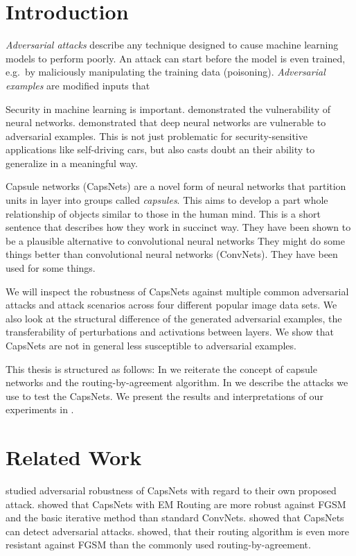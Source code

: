 \section{Introduction}
\label{sec:introduction}

\emph{Adversarial attacks} describe any technique designed to cause machine learning models to perform poorly.
An attack can start before the model is even trained, e.g.\ by maliciously manipulating the training data (poisoning).
\emph{Adversarial examples} are modified inputs that

Security in machine learning is important.
\citet{intriguing} demonstrated the vulnerability of neural networks.
\citet{fgsm} demonstrated that deep neural networks are vulnerable to adversarial examples.
This is not just problematic for security-sensitive applications like self-driving cars, but also casts doubt an their ability to generalize in a meaningful way.

Capsule networks (CapsNets) \citep{capsules,em} are a novel form of neural networks that partition units in layer into groups called \emph{capsules}. This aims to develop a part whole relationship of objects similar to those in the human mind. 
This is a short sentence that describes how they work in succinct way.
They have been shown to be a plausible alternative to convolutional neural networks 
They might do some things better than convolutional neural networks (ConvNets).
They have been used for some things.

We will inspect the robustness of CapsNets against multiple common adversarial attacks and attack scenarios across four different popular image data sets.
We also look at the structural difference of the generated adversarial examples, the transferability of perturbations and activations between layers.
We show that CapsNets are not in general less susceptible to adversarial examples.

This thesis is structured as follows: In  we reiterate the concept of capsule networks and the routing-by-agreement algorithm. In  we describe the attacks we use to test the CapsNets. We present the results and interpretations of our experiments in .


\section{Related Work}
\label{sec:related}

\citet{capsattacktraffic} studied adversarial robustness of CapsNets with regard to their own proposed attack.
\citet{em} showed that CapsNets with EM Routing are more robust against FGSM \citep{fgsm} and the basic iterative method \citep{bim} than standard ConvNets.
\citet{darccc} showed that CapsNets can detect adversarial attacks.
\citet{scaledagreement} showed, that their routing algorithm is even more resistant against FGSM than the commonly used routing-by-agreement.